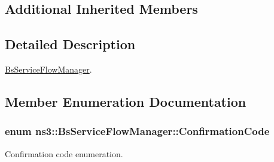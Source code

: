 \subsection*{Additional Inherited Members}


\subsection{Detailed Description}
\hyperlink{classns3_1_1BsServiceFlowManager}{Bs\+Service\+Flow\+Manager}. 

\subsection{Member Enumeration Documentation}
\subsubsection[{\texorpdfstring{Confirmation\+Code}{ConfirmationCode}}]{\setlength{\rightskip}{0pt plus 5cm}enum {\bf ns3\+::\+Bs\+Service\+Flow\+Manager\+::\+Confirmation\+Code}}\hypertarget{classns3_1_1BsServiceFlowManager_a7caa3307401b19d092e9dd656d5aa523}{}\label{classns3_1_1BsServiceFlowManager_a7caa3307401b19d092e9dd656d5aa523}


Confirmation code enumeration. 

